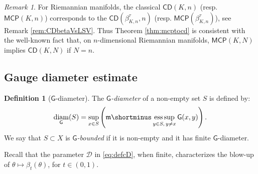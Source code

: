 \documentclass[11pt,a4paper]{article}
\theoremstyle{plain}
\theoremstyle{definition}
\newtheorem{definition}[theorem]{Definition}
\theoremstyle{remark}
\newtheorem{remark}[theorem]{Remark}
\numberwithin{equation}{section}
\newcommand{\CD}{\mathsf{CD}}
\newcommand{\MCP}{\mathsf{MCP}}
\newcommand{\cD}{\mathcal{D}}
\DeclareMathOperator{\diam}{\mathrm{diam}}
\DeclareMathOperator*{\esssup}{ess\,sup}
\newcommand{\mm}{\mathfrak m}
\newcommand{\sfG}{\mathsf G}
\begin{document}
\begin{remark}
For Riemannian manifolds, the classical $\CD(K,n)$ (resp.\;$\MCP(K,n)$) corresponds to the $\CD(\beta^\tau_{K,n},n)$ (resp. $\MCP(\beta^\tau_{K,n})$), see Remark \ref{rem:CDbetaVsLSV}. Thus Theorem \ref{thm:mcptocd} is consistent with the well-known fact that, on $n$-dimensional Riemannian manifolds, $\MCP(K,N)$ implies $\CD(K,N)$ if $N=n$.
\end{remark}

\subsection{Gauge diameter estimate}\label{sec:diam}

\begin{definition}[$\sfG$-diameter]\label{def:Gdiam}
The \emph{$\sfG$-diameter} of a non-empty set $S$ is defined by:
\begin{equation}
\diam_\sfG(S) = \sup_{x\in S} \left(\mm\shortminus\esssup_{y\in S, \,  y\neq x} \sfG(x,y)\right).
\end{equation}
We say that $S\subset X$ is \emph{$\sfG$-bounded} if it is non-empty and it has finite $\sfG$-diameter.
\end{definition}

Recall that the parameter $\cD$ in \eqref{eq:defcD}, when finite, characterizes the blow-up of $\theta\mapsto \beta_t(\theta)$, for $t\in (0,1)$.
\end{document}
